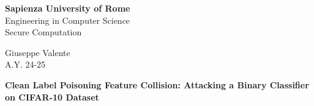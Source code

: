 \documentclass{article}
\date{}
\begin{document}
\begin{titlepage}
    \centering
    \vspace*{1.5cm}
    {\huge \textbf{Sapienza University of Rome} \\ 
    \LARGE Engineering in Computer Science \\ 
    \Large Secure Computation \par}
    \vspace{1cm}
    {\Large Giuseppe Valente \\ 
    \large A.Y. 24-25 \par}
    
    \vspace{5cm}
    {\Large \textbf{Clean Label Poisoning Feature Collision: Attacking a Binary Classifier on CIFAR-10 Dataset} \par}
    \vspace{1cm}
    \vfill
    \thispagestyle{empty}
\end{titlepage}

\thispagestyle{empty}

\newpage

\tableofcontents
\thispagestyle{empty}
\newpage






\end{document}
